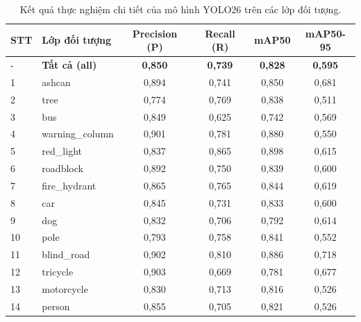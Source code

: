 \begin{table}[h!]
    \centering
    \caption{Kết quả thực nghiệm chi tiết của mô hình YOLO26 trên các lớp đối tượng.}
    \label{tab:training_results}
    \begin{tabular}{llcccc}
        \toprule
        \textbf{STT} & \textbf{Lớp đối tượng} & \textbf{Precision (P)} & \textbf{Recall (R)} & \textbf{mAP50} & \textbf{mAP50-95} \\
        \midrule
        -  & \textbf{Tất cả (all)}    & \textbf{0,850} & \textbf{0,739} & \textbf{0,828} & \textbf{0,595} \\
        \midrule
        1  & ashcan                 & 0,894          & 0,741          & 0,850          & 0,681          \\
        2  & tree                   & 0,774          & 0,769          & 0,838          & 0,511          \\
        3  & bus                    & 0,849          & 0,625          & 0,742          & 0,569          \\
        4  & warning\_column        & 0,901          & 0,781          & 0,880          & 0,550          \\
        5  & red\_light             & 0,837          & 0,865          & 0,898          & 0,615          \\
        6  & roadblock              & 0,892          & 0,750          & 0,839          & 0,600          \\
        7  & fire\_hydrant          & 0,865          & 0,765          & 0,844          & 0,619          \\
        8  & car                    & 0,845          & 0,731          & 0,833          & 0,600          \\
        9  & dog                    & 0,832          & 0,706          & 0,792          & 0,614          \\
        10 & pole                   & 0,793          & 0,758          & 0,841          & 0,552          \\
        11 & blind\_road            & 0,902          & 0,810          & 0,886          & 0,718          \\
        12 & tricycle               & 0,903          & 0,669          & 0,781          & 0,677          \\
        13 & motorcycle             & 0,830          & 0,713          & 0,816          & 0,526          \\
        14 & person                 & 0,855          & 0,705          & 0,821          & 0,526          \\

\end{tabular}
\end{table}
